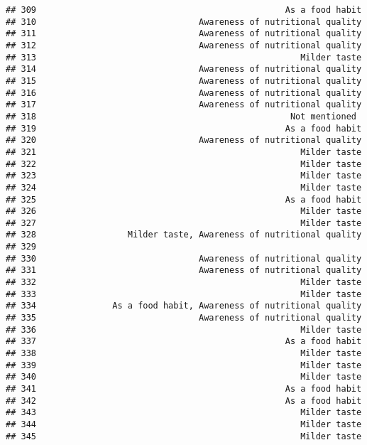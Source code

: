 \documentclass[
]{article}
\begin{document}
\begin{verbatim}
## 309                                                 As a food habit
## 310                                Awareness of nutritional quality
## 311                                Awareness of nutritional quality
## 312                                Awareness of nutritional quality
## 313                                                    Milder taste
## 314                                Awareness of nutritional quality
## 315                                Awareness of nutritional quality
## 316                                Awareness of nutritional quality
## 317                                Awareness of nutritional quality
## 318                                                  Not mentioned 
## 319                                                 As a food habit
## 320                                Awareness of nutritional quality
## 321                                                    Milder taste
## 322                                                    Milder taste
## 323                                                    Milder taste
## 324                                                    Milder taste
## 325                                                 As a food habit
## 326                                                    Milder taste
## 327                                                    Milder taste
## 328                  Milder taste, Awareness of nutritional quality
## 329                                                                
## 330                                Awareness of nutritional quality
## 331                                Awareness of nutritional quality
## 332                                                    Milder taste
## 333                                                    Milder taste
## 334               As a food habit, Awareness of nutritional quality
## 335                                Awareness of nutritional quality
## 336                                                    Milder taste
## 337                                                 As a food habit
## 338                                                    Milder taste
## 339                                                    Milder taste
## 340                                                    Milder taste
## 341                                                 As a food habit
## 342                                                 As a food habit
## 343                                                    Milder taste
## 344                                                    Milder taste
## 345                                                    Milder taste

\end{verbatim}
\end{document}
